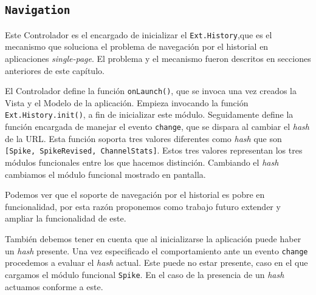	\subsection{\texttt{Navigation}}
		Este Controlador es el encargado de inicializar el \texttt{Ext.History},que es el mecanismo que soluciona el problema de navegación por el
		historial en aplicaciones \emph{single-page}. El problema y el mecanismo fueron descritos en secciones anteriores de este capítulo.
		\par
		El Controlador define la función \texttt{onLaunch()}, que se invoca una vez creados la Vista y el Modelo de la aplicación.
		Empieza invocando la función \texttt{Ext.History.init()}, a fin de inicializar este módulo. Seguidamente define la
		función encargada de manejar el evento \texttt{change}, que se dispara al cambiar el \emph{hash} de la URL. Esta función soporta tres
		valores diferentes como \emph{hash} que son \texttt{[Spike, SpikeRevised, ChannelStats]}. Estos tres valores representan los tres
		módulos funcionales entre los que hacemos distinción. Cambiando el \emph{hash} cambiamos el módulo funcional mostrado en
		pantalla.
		\par
		Podemos ver que el soporte de navegación por el historial es pobre en funcionalidad, por esta razón proponemos como trabajo futuro
		extender y ampliar la funcionalidad de este.
		\par
		También debemos tener en cuenta que al inicializarse la aplicación puede haber un \emph{hash} presente. Una vez especificado el
		comportamiento ante un evento \texttt{change} procedemos a evaluar el \emph{hash} actual. Este puede no estar presente, caso en el que
		cargamos el módulo funcional \texttt{Spike}. En el caso de la presencia de un \emph{hash} actuamos conforme a este.
